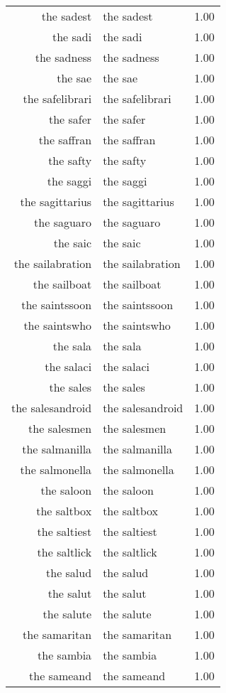 \begin{table}[ht]
\begin{tabular}{rlr}
  the sadest & the sadest & 1.00 \\ 
  the sadi & the sadi & 1.00 \\ 
  the sadness & the sadness & 1.00 \\ 
  the sae & the sae & 1.00 \\ 
  the safelibrari & the safelibrari & 1.00 \\ 
  the safer & the safer & 1.00 \\ 
  the saffran & the saffran & 1.00 \\ 
  the safty & the safty & 1.00 \\ 
  the saggi & the saggi & 1.00 \\ 
  the sagittarius & the sagittarius & 1.00 \\ 
  the saguaro & the saguaro & 1.00 \\ 
  the saic & the saic & 1.00 \\ 
  the sailabration & the sailabration & 1.00 \\ 
  the sailboat & the sailboat & 1.00 \\ 
  the saintssoon & the saintssoon & 1.00 \\ 
  the saintswho & the saintswho & 1.00 \\ 
  the sala & the sala & 1.00 \\ 
  the salaci & the salaci & 1.00 \\ 
  the sales & the sales & 1.00 \\ 
  the salesandroid & the salesandroid & 1.00 \\ 
  the salesmen & the salesmen & 1.00 \\ 
  the salmanilla & the salmanilla & 1.00 \\ 
  the salmonella & the salmonella & 1.00 \\ 
  the saloon & the saloon & 1.00 \\ 
  the saltbox & the saltbox & 1.00 \\ 
  the saltiest & the saltiest & 1.00 \\ 
  the saltlick & the saltlick & 1.00 \\ 
  the salud & the salud & 1.00 \\ 
  the salut & the salut & 1.00 \\ 
  the salute & the salute & 1.00 \\ 
  the samaritan & the samaritan & 1.00 \\ 
  the sambia & the sambia & 1.00 \\ 
  the sameand & the sameand & 1.00 \\ 

\end{tabular}
\end{table}
